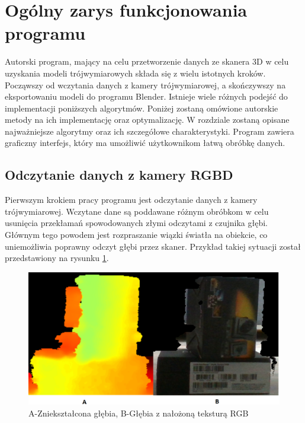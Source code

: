 \section{Ogólny zarys funkcjonowania programu}
Autorski program, mający na celu przetworzenie danych ze skanera 3D w celu uzyskania modeli trójwymiarowych składa się z wielu istotnych kroków. Począwszy od wczytania danych z kamery trójwymiarowej, a skończywszy na eksportowaniu modeli do programu Blender. Istnieje wiele różnych podejść do implementacji poniższych algorytmów. Poniżej zostaną omówione autorskie metody na ich implementację oraz optymalizację. W rozdziale zostaną opisane najważniejsze algorytmy oraz ich szczegółowe charakterystyki. Program zawiera graficzny interfejs, który ma umożliwić użytkownikom łatwą obróbkę danych.
\subsection{Odczytanie danych z kamery RGBD}
Pierwszym krokiem pracy programu jest odczytanie danych z kamery trójwymiarowej. Wczytane dane są poddawane różnym obróbkom w celu usunięcia przekłamań spowodowanych złymi odczytami z czujnika głębi. Głównym tego powodem jest rozpraszanie wiązki światła na obiekcie, co uniemożliwia poprawny odczyt głębi przez skaner. Przykład takiej sytuacji został przedstawiony na rysunku \ref{fig:depthErrorImage}.
\begin{figure}[H]
  \centering
  \includegraphics[scale=0.4]{pudelko_glebia_kolor.png}
  \caption{A-Zniekształcona głębia, B-Głębia z nałożoną teksturą RGB}   
  \label{fig:depthErrorImage}
\end{figure}
